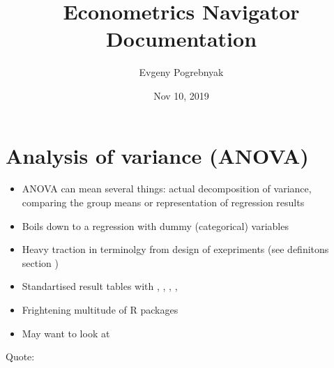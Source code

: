 \documentclass[letterpaper,10pt,english]{sphinxmanual}
\title{Econometrics Navigator Documentation}
\date{Nov 10, 2019}
\author{Evgeny Pogrebnyak}
\begin{document}
\pagestyle{empty}
\sphinxmaketitle
\pagestyle{plain}
\sphinxtableofcontents
\pagestyle{normal}
\label{\detokenize{index::doc}}



\chapter{Analysis of variance (ANOVA)}
\label{\detokenize{topics/anova:analysis-of-variance-anova}}\label{\detokenize{topics/anova::doc}}\begin{itemize}
\item {} 
ANOVA can mean several things: actual decomposition of variance, comparing the group means or representation of regression results

\item {} 
Boils down to a regression with dummy (categorical) variables

\item {} 
Heavy traction in terminolgy from design of exepriments (see definitons section )

\item {} 
Standartised result tables with , , , , 

\item {} 
Frightening multitude of R packages

\item {} 
May want to look at 

\end{itemize}

Quote:
\begin{quote}

 
\end{quote}
\end{document}
